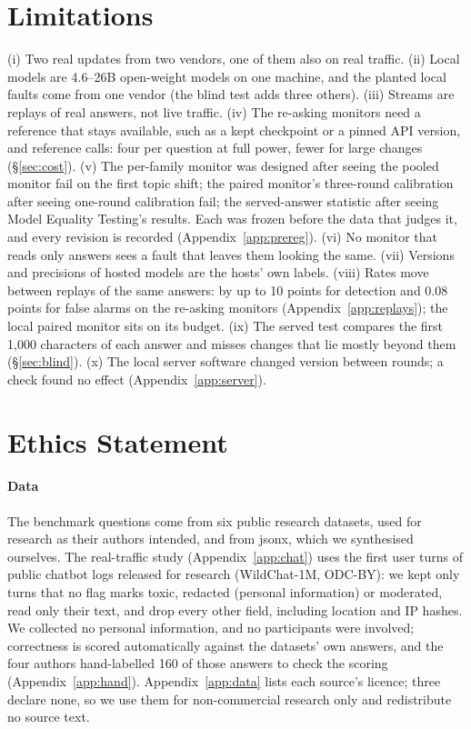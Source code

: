 \documentclass[11pt]{article}
\begin{document}
\section*{Limitations}
(i) Two real updates from two vendors, one of them also on real traffic. (ii) Local models are 4.6--26B open-weight models on one
machine, and the planted local faults come from one vendor (the blind test adds
three others). (iii) Streams are replays of
real answers, not live traffic. (iv) The re-asking monitors need a reference that
stays available, such as a kept checkpoint or a pinned API version, and reference
calls: four per question at full power, fewer for large changes (\S\ref{sec:cost}). (v) The per-family monitor was designed
after seeing the pooled monitor fail on the first topic shift; the paired monitor's
three-round calibration after seeing one-round calibration fail; the served-answer
statistic after seeing Model Equality Testing's results. Each was frozen before the
data that judges it, and every revision is recorded (Appendix~\ref{app:prereg}).
(vi) No monitor that reads only answers sees a fault that leaves them looking the
same. (vii) Versions and precisions of hosted models are the hosts' own labels.
(viii) Rates move between replays of the same answers: by up to 10 points for
detection and 0.08 points for false alarms on the re-asking monitors
(Appendix~\ref{app:replays}); the local paired monitor sits on its budget.
(ix) The served test compares the first 1{,}000 characters of each answer and
misses changes that lie mostly beyond them (\S\ref{sec:blind}). (x) The local server software
changed version between rounds; a check found no effect (Appendix~\ref{app:server}).

\section*{Ethics Statement}
\paragraph{Data} The benchmark questions come from six public research datasets,
used for research as their authors intended, and from \textsf{jsonx}, which we
synthesised ourselves. The real-traffic study (Appendix~\ref{app:chat}) uses the
first user turns of public chatbot logs released for research (WildChat-1M,
ODC-BY): we kept only turns that no flag marks toxic, redacted (personal
information) or moderated, read only their text, and drop every other field,
including location and IP hashes. We collected no personal information, and no
participants were involved; correctness is scored automatically against the
datasets' own answers, and the four authors hand-labelled 160 of those answers to
check the scoring (Appendix~\ref{app:hand}). Appendix~\ref{app:data} lists each source's licence; three declare none, so we use them for non-commercial research only and redistribute no source text.
\end{document}
